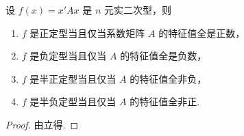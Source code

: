 \documentclass[../../main.tex]{subfiles}%
\begin{document}
\begin{corollary}\label{corollary:二次型式(半)正定型(负定型)的充要条件}
设 $f(x) = x'Ax$ 是 $n$ 元实二次型，则 
\begin{enumerate}
\item $f$ 是正定型当且仅当系数矩阵 $A$ 的特征值全是正数，

\item $f$ 是负定型当且仅当 $A$ 的特征值全是负数，

\item $f$ 是半正定型当且仅当 $A$ 的特征值全非负，

\item $f$ 是半负定型当且仅当 $A$ 的特征值全非正.
\end{enumerate}
\end{corollary}
\begin{proof}

由立得.

\end{proof}

\vspace{0.5cm}
\end{document}
